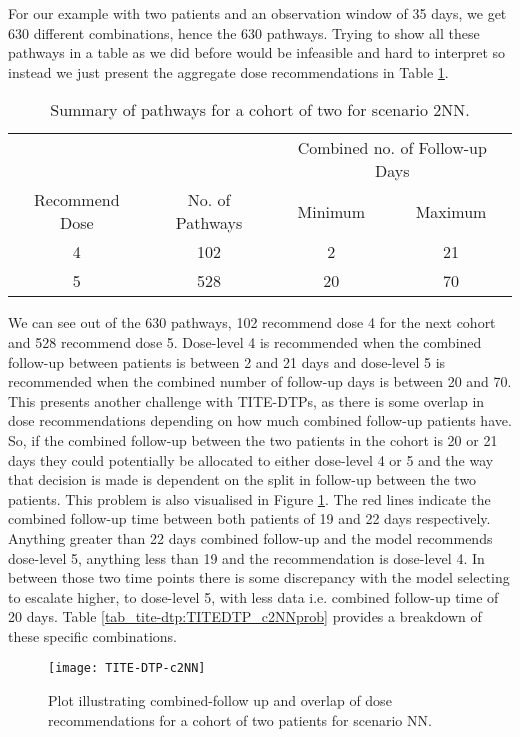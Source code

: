 For our example with two patients and an observation window of 35 days, we get 630 different combinations, hence the 630 pathways. Trying to show all these pathways in a table as we did before would be infeasible and hard to interpret so instead we just present the aggregate dose recommendations in Table \ref{tab_tite-dtp:TITEDTP_c2NN}. 

\begin{table}[H]
	\centering
	\caption{Summary of pathways for a cohort of two for scenario 2NN.}
	\label{tab_tite-dtp:TITEDTP_c2NN}
	\begin{tabular}{cccc}
		\hline
		\multicolumn{1}{l}{} & \multicolumn{1}{l}{} & \multicolumn{2}{c}{Combined no. of Follow-up Days} \\ \cline{3-4} 
		Recommend Dose & No. of Pathways & Minimum & Maximum \\ \hline
		4              & 102             & 2       & 21      \\
		5              & 528             & 20      & 70      \\ \hline
	\end{tabular}
\end{table}

We can see out of the 630 pathways, 102 recommend dose 4 for the next cohort and 528 recommend dose 5. Dose-level 4 is recommended when the combined follow-up between patients is between 2 and 21 days and dose-level 5 is recommended when the combined number of follow-up days is between 20 and 70. This presents another challenge with TITE-DTPs, as there is some overlap in dose recommendations depending on how much combined follow-up patients have. So, if the combined follow-up between the two patients in the cohort is 20 or 21 days they could potentially be allocated to either dose-level 4 or 5 and the way that decision is made is dependent on the split in follow-up between the two patients. This problem is also visualised in Figure \ref{fig_tite-dtp:c2NNprob}. The red lines indicate the combined follow-up time between both patients of 19 and 22 days respectively. Anything greater than 22 days combined follow-up and the model recommends dose-level 5, anything less than 19 and the recommendation is dose-level 4. In between those two time points there is some discrepancy with the model selecting to escalate higher, to dose-level 5, with less data i.e. combined follow-up time of 20 days. Table \ref{tab_tite-dtp:TITEDTP_c2NNprob} provides a breakdown of these specific combinations. 

\begin{figure}[h!]
	\centering
	\caption[Combined follow-up and dose decisions for a cohort of two.]{Plot illustrating combined-follow up and overlap of dose recommendations for a cohort of two patients for scenario NN.}
	\label{fig_tite-dtp:c2NNprob}
	\texttt{[image: TITE-DTP-c2NN]}
\end{figure}

